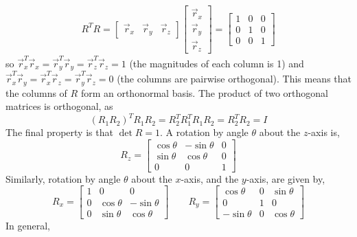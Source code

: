 \documentclass[letterpaper,12pt]{article}
\begin{document}
\begin{itemize}
    \begin{align*}
        R^T R = \begin{bmatrix} \vec{r}_x & \vec{r}_y & \vec{r}_z \end{bmatrix} \begin{bmatrix} \vec{r}_x \\ \vec{r}_y \\ \vec{r}_z \end{bmatrix} = \begin{bmatrix} 1 & 0 & 0 \\ 0 & 1 & 0 \\ 0 & 0 & 1 \end{bmatrix}
    \end{align*}
    so $\vec{r}_x^T \vec{r}_x = \vec{r}_y^T \vec{r}_y = \vec{r}_z^T \vec{r}_z = 1$ (the magnitudes of each column is 1) and $\vec{r}_x^T \vec{r}_y = \vec{r}_x^T \vec{r}_z = \vec{r}_y^T \vec{r}_z = 0$ (the columns are pairwise orthogonal). This means that the columns of $R$ form an orthonormal basis. The product of two orthogonal matrices is orthogonal, as
    \begin{equation*}
        (R_1 R_2)^T R_1 R_2 = R_2^T R_1^T R_1 R_2 = R_2^T R_2 = I
    \end{equation*}
    The final property is that $\det{R} = 1$. A rotation by angle $\theta$ about the $z$-axis is,
    \begin{equation*}
        \boxed{R_z = \begin{bmatrix} \cos{\theta} & -\sin{\theta} & 0 \\ \sin{\theta} & \cos{\theta} & 0 \\ 0 & 0 & 1 \end{bmatrix}}
    \end{equation*}
    Similarly, rotation by angle $\theta$ about the $x$-axis, and the $y$-axis, are given by,
    \begin{equation*}
        \boxed{R_x = \begin{bmatrix} 1 & 0 & 0 \\ 0 & \cos{\theta} & -\sin{\theta} \\ 0 & \sin{\theta} & \cos{\theta} \end{bmatrix}} \qquad \boxed{R_y = \begin{bmatrix} \cos{\theta} & 0 & \sin{\theta} \\ 0 & 1 & 0 \\ -\sin{\theta} & 0 & \cos{\theta} \end{bmatrix}}
    \end{equation*}
    In general,

\end{itemize}
\end{document}
